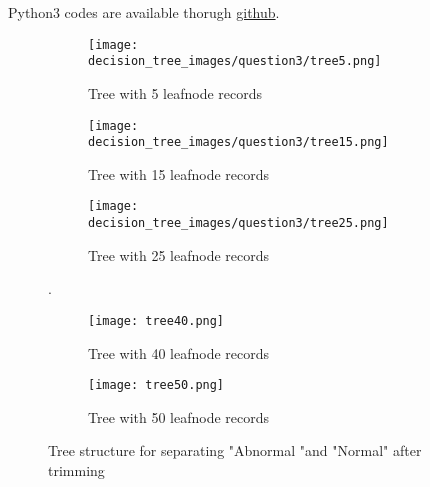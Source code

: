 \documentclass{article}
\begin{document}
Python3 codes are available thorugh \href{https://github.com/frankligy/exercise_codes/blob/master/decision_tree_copy3.py}{github}.

\begin{figure}[h]
    \centering
    \begin{subfigure}[h]{.45\linewidth}
    \texttt{[image: decision\_tree\_images/question3/tree5.png]}
    \caption{Tree with 5 leafnode records}
    \label{q3_tree5}
    \end{subfigure}
    
    \begin{subfigure}[h]{.45\linewidth}
    \texttt{[image: decision\_tree\_images/question3/tree15.png]}
    \caption{Tree with 15 leafnode records}
    \label{q3_tree15}
    \end{subfigure}
    \begin{subfigure}[h]{.45\linewidth}
    \texttt{[image: decision\_tree\_images/question3/tree25.png]}
    \caption{Tree with 25 leafnode records}
    \label{q3_tree25}
    \end{subfigure}. %
    
    \begin{subfigure}[h]{.45\linewidth}
    \texttt{[image: tree40.png]}
    \caption{Tree with 40 leafnode records}
    \label{q3_tree40}
    \end{subfigure}
    \begin{subfigure}[h]{.45\linewidth}
    \texttt{[image: tree50.png]}
    \caption{Tree with 50 leafnode records}
    \label{q3_tree50}
    \end{subfigure} 
    
    \caption{Tree structure for separating "Abnormal "and "Normal" after trimming}
    \label{fig5}
\end{figure}
\end{document}
